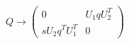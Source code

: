 \begin{equation}
Q\rightarrow \left(\begin{array}{cc} 0&U_1 q U_2^T\\ s  U_2q^T U_1^T &0
\end{array} \right)\qquad
\end{equation}

